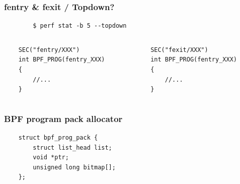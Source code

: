 \documentclass[usenames,dvipsnames, 18pt, compress, aspectratio=169]{beamer}
\begin{document}
\begin{frame}[fragile]{}
    \frametitle{fentry \& fexit / Topdown?}

    \begin{center}
        \begin{verbatim}
        $ perf stat -b 5 --topdown
        \end{verbatim}

        \vspace{0.5cm}

        \begin{columns}
            \begin{column}{0.5\textwidth}
                \begin{verbatim}
    SEC("fentry/XXX")
    int BPF_PROG(fentry_XXX)
    {
        //...
    }
               \end{verbatim}
           \end{column}

           \begin{column}{0.5\textwidth}
               \begin{verbatim}
    SEC("fexit/XXX")
    int BPF_PROG(fentry_XXX)
    {
        //...
    }
                \end{verbatim}
            \end{column}
        \end{columns}
    \end{center}
\end{frame}

\begin{frame}[fragile]{}
    \frametitle{BPF program pack allocator}

    \begin{center}
        \begin{verbatim}
    struct bpf_prog_pack {
        struct list_head list;
        void *ptr;
        unsigned long bitmap[];
    };
        \end{verbatim}
    \end{center}
\end{frame}
\end{document}
